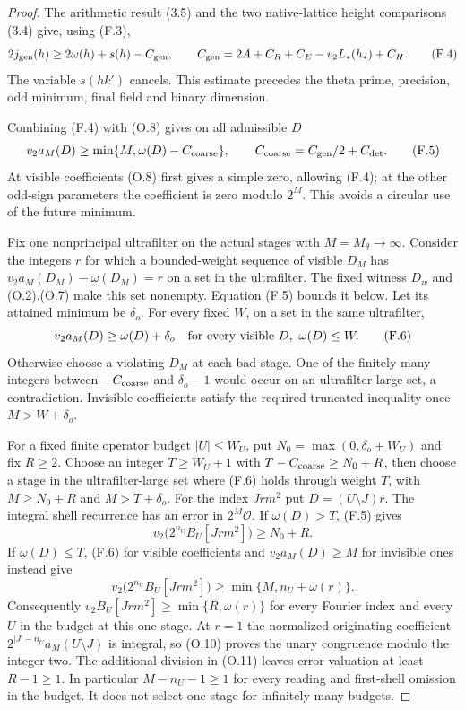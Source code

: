 \begin{proof}\leavevmode
The arithmetic result (3.5) and the two native-lattice height
comparisons (3.4) give, using (F.3),
\[
 2j_{\rm gen}(h)\ge2\omega(h)+s(h)-C_{\rm gen},\qquad
 C_{\rm gen}=2A+C_R+C_E-v_2L_*(h_*)+C_H.                         \tag{F.4}
\]
The variable $s(hk')$ cancels. This estimate precedes the theta
prime, precision, odd minimum, final field and binary dimension.

Combining (F.4) with (O.8) gives on all admissible $D$
\[
            v_2a_M(D)\ge\min\{M,\omega(D)-C_{\rm coarse}\},
 \qquad C_{\rm coarse}=C_{\rm gen}/2+C_{\rm det}.                 \tag{F.5}
\]
At visible coefficients (O.8) first gives a simple zero, allowing
(F.4); at the other odd-sign parameters the coefficient is zero
modulo $2^M$. This avoids a circular use of the future minimum.

Fix one nonprincipal ultrafilter on the actual stages with
$M=M_\theta\to\infty$. Consider the integers $r$ for which a
bounded-weight sequence of visible $D_M$ has
$v_2a_M(D_M)-\omega(D_M)=r$ on a set in the ultrafilter.
The fixed witness $D_w$ and (O.2),(O.7) make this set nonempty.
Equation (F.5) bounds it below. Let its attained minimum be
$\delta_o$. For every fixed $W$, on a set in the same ultrafilter,
\[
 v_2a_M(D)\ge\omega(D)+\delta_o
             \quad\hbox{for every visible }D,\ \omega(D)\le W.
 \tag{F.6}
\]
Otherwise choose a violating $D_M$ at each bad stage. One of the
finitely many integers between $-C_{\rm coarse}$ and
$\delta_o-1$ would occur on an ultrafilter-large set, a contradiction.
Invisible coefficients satisfy the required truncated inequality
once $M>W+\delta_o$.

For a fixed finite operator budget $|U|\le W_U$, put
$N_0=\max(0,\delta_o+W_U)$ and fix $R\ge2$.
Choose an integer $T\ge W_U+1$ with
$T-C_{\rm coarse}\ge N_0+R$, then choose a stage in the
ultrafilter-large set where (F.6) holds through weight $T$, with
$M\ge N_0+R$ and $M>T+\delta_o$.
For the index $Jrm^2$ put $D=(U\setminus J)r$.
The integral shell recurrence has an error in $2^M\mathcal O$.
If $\omega(D)>T$, (F.5) gives
\[
 v_2\bigl(2^{n_U}B_U[Jrm^2]\bigr)\ge N_0+R.
\]
If $\omega(D)\le T$, (F.6) for visible coefficients and
$v_2a_M(D)\ge M$ for invisible ones instead give
\[
 v_2\bigl(2^{n_U}B_U[Jrm^2]\bigr)
       \ge\min\{M,n_U+\omega(r)\}.
\]
Consequently $v_2B_U[Jrm^2]\ge\min\{R,\omega(r)\}$ for every
Fourier index and every $U$ in the budget at this one stage.
At $r=1$ the normalized originating coefficient
$2^{|J|-n_U}a_M(U\setminus J)$ is integral, so (O.10) proves
the unary congruence modulo the integer two.
The additional division in (O.11) leaves error valuation at least
$R-1\ge1$.  In particular $M-n_U-1\ge1$ for every reading and
first-shell omission in the budget.
It does not select one stage for infinitely many budgets.


\end{proof}
